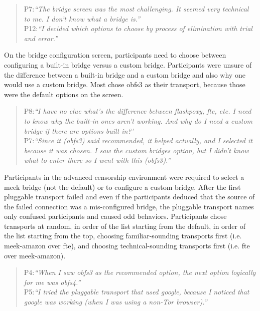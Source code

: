 \documentclass[USenglish,oneside,twocolumn]{article}
\begin{document}
\begin{quotation}
\noindent P7:\textit{``The bridge screen was the most challenging. It seemed very technical to me. I don't know what a bridge is.''}\\

\noindent P12:\textit{``I decided which options to choose by process of elimination with trial and error.''}
\end{quotation} 

On the bridge configuration screen, participants need to choose between configuring a built-in bridge versus a custom bridge. Participants were unsure of the difference between a built-in bridge and a custom bridge and also why one would use a custom bridge. Most chose obfs3 as their transport, because those were the default options on the screen. 

\begin{quotation} 
\noindent P8:\textit{``I have no clue what's the difference between flashpoxy, fte, etc. I need to know why the built-in ones aren't working. And why do I need a custom bridge if there are options built in?'}\\

\noindent P7:\textit{``Since it (obfs3) said recommended, it helped actually, and I selected it because it was chosen. I saw the custom bridges option, but I didn't know what to enter there so I went with this (obfs3).''}
\end{quotation} 

Participants in the advanced censorship environment were required to select a meek bridge (not the default) or to configure a custom bridge. After the first pluggable transport failed and even if the participants deduced that the source of the failed connection was a mis-configured bridge, the pluggable transport names only confused participants and caused odd behaviors. Participants chose transports at random, in order of the list starting from the default, in order of the list starting from the top, choosing familiar-sounding transports first (i.e. meek-amazon over fte), and choosing technical-sounding transports first (i.e. fte over meek-amazon). 

\begin{quotation}
\noindent P4:\textit{``When I saw obfs3 as the recommended option, the next option logically for me was obfs4.''}\\

\noindent P5:\textit{``I tried the pluggable transport that used google, because I noticed that google was working (when I was using a non-Tor browser).''}
\end{quotation} 
\end{document}

